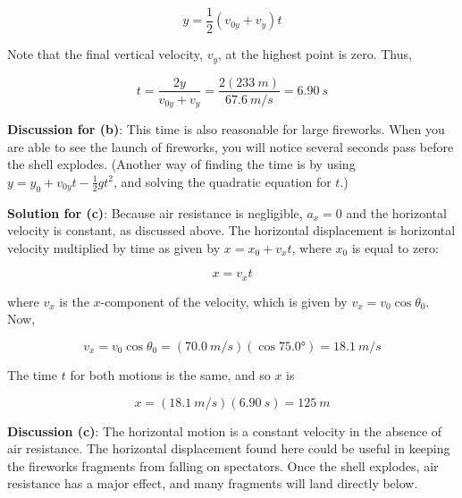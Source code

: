 \documentclass[../../main-ap-physics.tex]{subfiles}
\begin{document}
\begin{equation*}
    y = \frac{1}{2}\left(v_{0y} + v_y\right)t
\end{equation*}

Note that the final vertical velocity, $v_y$, at the highest point is zero. Thus,

\begin{equation*}
    t = \frac{2y}{v_{0y} + v_y} = \frac{2 \left(\SI{233}{m}\right)}{\SI{67.6}{m/s}} = \SI{6.90}{s}
\end{equation*}

\textbf{Discussion for (b)}: This time is also reasonable for large fireworks. When you are able to see the launch of fireworks, you will notice several seconds pass before the shell explodes. (Another way of finding the time is by using $y = y_0 + v_{0y} t - \frac{1}{2} g t^2$, and solving the quadratic equation for $t$.)

\vspace{1em}

\textbf{Solution for (c)}: Because air resistance is negligible, $a_x = 0$ and the horizontal velocity is constant, as discussed above. The horizontal displacement is horizontal velocity multiplied by time as given by $x = x_0 + v_x t$, where $x_0$ is equal to zero:

\begin{equation*}
    x = v_x t
\end{equation*}

where $v_x$ is the $x$-component of the velocity, which is given by $v_x = v_0 \cos{\theta_0}$. Now,

\begin{equation*}
    v_x = v_0 \cos{\theta_0} = \left(\SI{70.0}{m/s}\right) \left(\cos{\ang{75.0}}\right) = \SI{18.1}{m/s}
\end{equation*}

The time $t$ for both motions is the same, and so $x$ is

\begin{equation*}
    x = \left(\SI{18.1}{m/s}\right) \left(\SI{6.90}{s}\right) = \SI{125}{m}
\end{equation*}

\textbf{Discussion (c)}: The horizontal motion is a constant velocity in the absence of air resistance. The horizontal displacement found here could be useful in keeping the fireworks fragments from falling on spectators. Once the shell explodes, air resistance has a major effect, and many fragments will land directly below.

\endsolution
\end{document}
